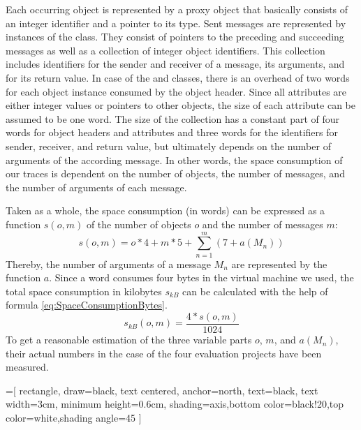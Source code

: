 Each occurring object is represented by a proxy object that basically consists of an integer identifier and a pointer to its type.
Sent messages are represented by instances of the  class.
They consist of pointers to the preceding and succeeding messages as well as a collection of integer object identifiers.
This collection includes identifiers for the sender and receiver of a message, its arguments, and for its return value.
In case of the  and  classes, there is an overhead of two words for each object instance consumed by the object header.
Since all attributes are either integer values or pointers to other objects, the size of each attribute can be assumed to be one word.
The size of the  collection has a constant part of four words for object headers and attributes and three words for the identifiers for sender, receiver, and return value, but ultimately depends on the number of arguments of the according message.
In other words, the space consumption of our traces is dependent on the number of objects, the number of messages, and the number of arguments of each message.

Taken as a whole, the space consumption (in words) can be expressed as a function $s(o,m)$ of the number of objects $o$ and the number of messages $m$:
\begin{equation}
s(o,m)=o*4 + m*5 + \sum_{n=1}^{m} (7 + a(M_n))\label{eq:SpaceConsumptionWords}
\end{equation}
Thereby, the number of arguments of a message $M_n$ are represented by the function $a$.
Since a word consumes four bytes in the virtual machine we used, the total space consumption in kilobytes $s_{kB}$ can be calculated with the help of formula \ref{eq:SpaceConsumptionBytes}. 
\begin{equation}
s_{kB}(o,m) = \frac{4 * s(o,m)}{1024}\label{eq:SpaceConsumptionBytes}
\end{equation}
To get a reasonable estimation of the three variable parts $o$, $m$, and $a(M_n)$, their actual numbers in the case of the four evaluation projects have been measured.

\usetikzlibrary{positioning,shapes,shadows,arrows}
=[
	rectangle,
	draw=black,
	text centered,
	anchor=north,
	text=black,
	text width=3cm,
	minimum height=0.6cm,
	shading=axis,bottom color=black!20,top color=white,shading angle=45
	]
	

